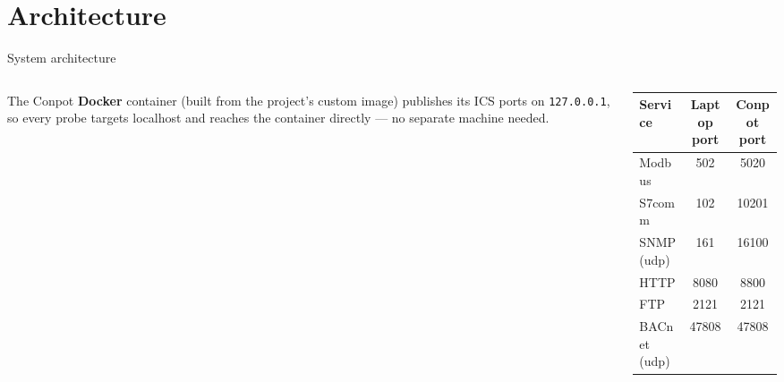 \documentclass[aspectratio=169,11pt]{beamer}
\begin{document}
\section{Architecture}
\begin{frame}{System architecture}
  \begin{center}
  \end{center}
  \vfill
  \begin{columns}[T]
    \begin{column}{0.46\textwidth}
      The Conpot \textbf{Docker} container (built from the project's custom image)
      publishes its ICS ports on \texttt{127.0.0.1}, so every probe targets localhost and
      reaches the container directly --- no separate machine needed.
    \end{column}
    \begin{column}{0.54\textwidth}
      \centering\small
      \begin{tabular}{@{}lcc@{}}
        \toprule
        \textbf{Service} & \textbf{Laptop port} & \textbf{Conpot port}\\
        \midrule
        Modbus      & 502       & 5020  \\
        S7comm      & 102       & 10201 \\
        SNMP (udp)  & 161       & 16100 \\
        HTTP        & 8080      & 8800  \\
        FTP         & 2121      & 2121  \\
        BACnet (udp)& 47808     & 47808 \\
        \bottomrule
      \end{tabular}
    \end{column}
  \end{columns}
\end{frame}
\end{document}
